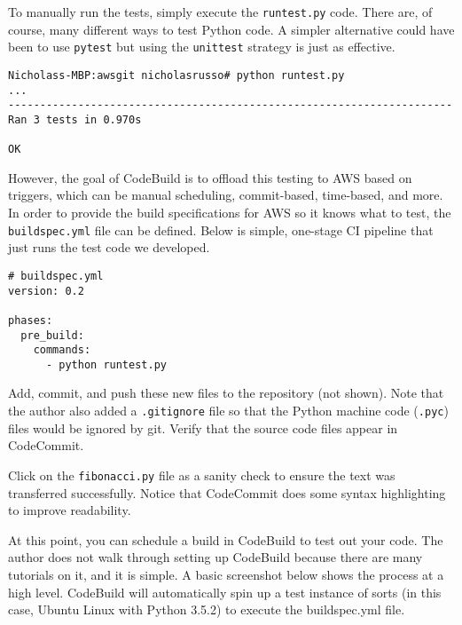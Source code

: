 To manually run the tests, simply execute the \verb|runtest.py| code. There
are, of course, many different ways to test Python code. A simpler alternative
could have been to use \verb|pytest| but using the \verb|unittest| strategy
is just as effective.

\begin{verbatim}
Nicholass-MBP:awsgit nicholasrusso# python runtest.py
...
----------------------------------------------------------------------
Ran 3 tests in 0.970s

OK
\end{verbatim}

However, the goal of CodeBuild is to offload this testing to AWS based on
triggers, which can be manual scheduling, commit-based, time-based, and more.
In order to provide the build specifications for AWS so it knows what to test,
the \verb|buildspec.yml| file can be defined. Below is simple, one-stage CI pipeline
that just runs the test code we developed.

\begin{verbatim}
# buildspec.yml
version: 0.2

phases:
  pre_build:
    commands:
      - python runtest.py
\end{verbatim}

Add, commit, and push these new files to the repository (not shown). Note that
the author also added a \verb|.gitignore| file so that the Python machine code
(\verb|.pyc|) files would be ignored by git. Verify that the source code files
appear in CodeCommit.


Click on the \verb|fibonacci.py| file as a sanity check to ensure the text was
transferred successfully. Notice that CodeCommit does some syntax highlighting
to improve readability.


At this point, you can schedule a build in CodeBuild to test out your code.
The author does not walk through setting up CodeBuild because there are many
tutorials on it, and it is simple. A basic screenshot below shows the process
at a high level. CodeBuild will automatically spin up a test instance of sorts
(in this case, Ubuntu Linux with Python 3.5.2) to execute the buildspec.yml file.



